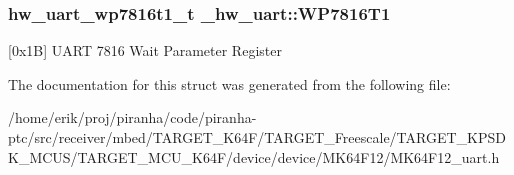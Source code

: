 \subsubsection[{\texorpdfstring{W\+P7816\+T1}{WP7816T1}}]{ {\bf hw\+\_\+uart\+\_\+wp7816t1\+\_\+t} \+\_\+hw\+\_\+uart\+::\+W\+P7816\+T1}\hypertarget{struct__hw__uart_aec534766c70fc125e816a8a623d10472}{}\label{struct__hw__uart_aec534766c70fc125e816a8a623d10472}
\mbox{[}0x1B\mbox{]} U\+A\+RT 7816 Wait Parameter Register 

The documentation for this struct was generated from the following file\+:\begin{DoxyCompactItemize}
\item 
/home/erik/proj/piranha/code/piranha-\/ptc/src/receiver/mbed/\+T\+A\+R\+G\+E\+T\+\_\+\+K64\+F/\+T\+A\+R\+G\+E\+T\+\_\+\+Freescale/\+T\+A\+R\+G\+E\+T\+\_\+\+K\+P\+S\+D\+K\+\_\+\+M\+C\+U\+S/\+T\+A\+R\+G\+E\+T\+\_\+\+M\+C\+U\+\_\+\+K64\+F/device/device/\+M\+K64\+F12/M\+K64\+F12\+\_\+uart.\+h\end{DoxyCompactItemize}
